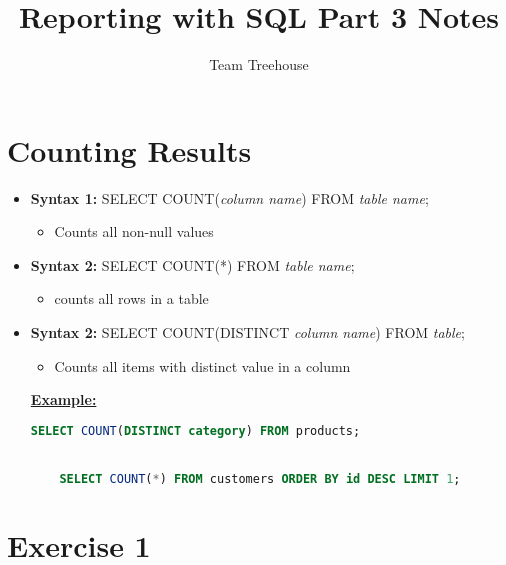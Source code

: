 \documentclass[12pt]{article}
\begin{document}
\title{Reporting with SQL Part 3 Notes}
\author{Team Treehouse}
\maketitle

\bigskip

\section{Counting Results}

\bigskip

\begin{itemize}
    \item \textbf{Syntax 1:} SELECT COUNT(\textit{column name}) FROM \textit{table name};
    \begin{itemize}
        \item Counts all non-null values
    \end{itemize}
    \item \textbf{Syntax 2:} SELECT COUNT(*) FROM \textit{table name};
    \begin{itemize}
        \item counts all rows in a table
    \end{itemize}
    \item \textbf{Syntax 2:} SELECT COUNT(DISTINCT \textit{column name}) FROM \textit{table};
    \begin{itemize}
        \item Counts all items with distinct value in a column
    \end{itemize}

    \bigskip

    \underline{\textbf{Example:}}

    \bigskip

    \begin{lstlisting}[language=SQL]
    SELECT COUNT(DISTINCT category) FROM products;


    SELECT COUNT(*) FROM customers ORDER BY id DESC LIMIT 1;
    \end{lstlisting}

\end{itemize}

\bigskip

\section{Exercise 1}

\bigskip
\end{document}
